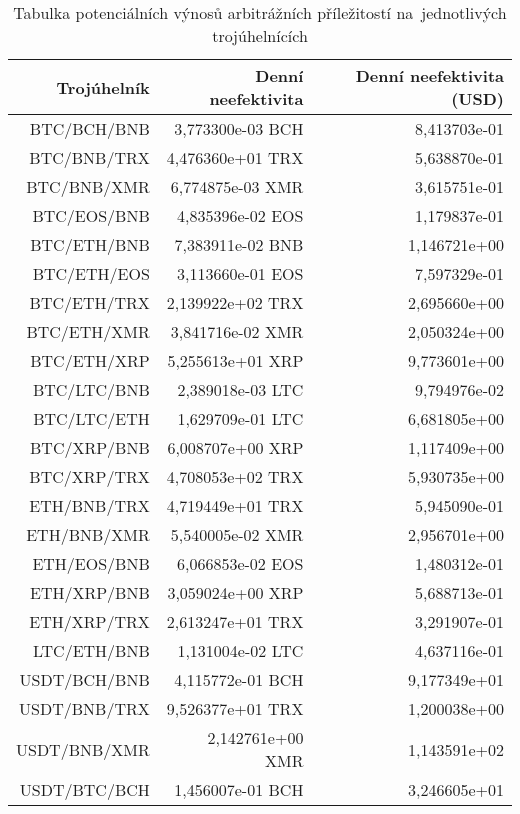 \begin{table}\centering
\caption{Tabulka potenciálních výnosů arbitrážních příležitostí na~jednotlivých trojúhelnících}
\label{table_gains}
\begin{tabular}{|| r | r | r ||}\hline Trojúhelník & Denní neefektivita & Denní neefektivita (USD)\\ [0.5ex]
 \hline\hline BTC/BCH/BNB & 3,773300e-03 BCH & 8,413703e-01\\ 
 \hline BTC/BNB/TRX & 4,476360e+01 TRX & 5,638870e-01\\ 
 \hline BTC/BNB/XMR & 6,774875e-03 XMR & 3,615751e-01\\ 
 \hline BTC/EOS/BNB & 4,835396e-02 EOS & 1,179837e-01\\ 
 \hline BTC/ETH/BNB & 7,383911e-02 BNB & 1,146721e+00\\ 
 \hline BTC/ETH/EOS & 3,113660e-01 EOS & 7,597329e-01\\ 
 \hline BTC/ETH/TRX & 2,139922e+02 TRX & 2,695660e+00\\ 
 \hline BTC/ETH/XMR & 3,841716e-02 XMR & 2,050324e+00\\ 
 \hline BTC/ETH/XRP & 5,255613e+01 XRP & 9,773601e+00\\ 
 \hline BTC/LTC/BNB & 2,389018e-03 LTC & 9,794976e-02\\ 
 \hline BTC/LTC/ETH & 1,629709e-01 LTC & 6,681805e+00\\ 
 \hline BTC/XRP/BNB & 6,008707e+00 XRP & 1,117409e+00\\ 
 \hline BTC/XRP/TRX & 4,708053e+02 TRX & 5,930735e+00\\ 
 \hline ETH/BNB/TRX & 4,719449e+01 TRX & 5,945090e-01\\ 
 \hline ETH/BNB/XMR & 5,540005e-02 XMR & 2,956701e+00\\ 
 \hline ETH/EOS/BNB & 6,066853e-02 EOS & 1,480312e-01\\ 
 \hline ETH/XRP/BNB & 3,059024e+00 XRP & 5,688713e-01\\ 
 \hline ETH/XRP/TRX & 2,613247e+01 TRX & 3,291907e-01\\ 
 \hline LTC/ETH/BNB & 1,131004e-02 LTC & 4,637116e-01\\ 
 \hline USDT/BCH/BNB & 4,115772e-01 BCH & 9,177349e+01\\ 
 \hline USDT/BNB/TRX & 9,526377e+01 TRX & 1,200038e+00\\ 
 \hline USDT/BNB/XMR & 2,142761e+00 XMR & 1,143591e+02\\ 
 \hline USDT/BTC/BCH & 1,456007e-01 BCH & 3,246605e+01\\ 

\end{tabular}
\end{table}
